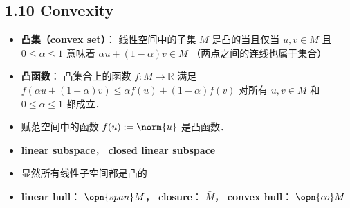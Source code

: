 \subsection{1.10 Convexity}
\begin{itemize}
\item \textbf{凸集（convex set）}： 线性空间中的子集 $M$ 是凸的当且仅当 $u, v\in M$ 且 $0\le\alpha\le1$ 意味着 $\alpha u+(1-\alpha)v\in M$ （两点之间的连线也属于集合）

\item \textbf{凸函数}： 凸集合上的函数 $f:M\to\mathbb R$ 满足 $f(\alpha u + (1-\alpha)v) \le \alpha f(u)+(1-\alpha)f(v)$ 对所有 $u, v\in M$ 和 $0\le\alpha\le1$ 都成立．

\item 赋范空间中的函数 $f(u) := \norm{u}$ 是凸函数．

\item \textbf{linear subspace}， \textbf{closed linear subspace}

\item 显然所有线性子空间都是凸的

\item \textbf{linear hull}： $\opn{span} M$， \textbf{closure}： $\bar M$， \textbf{convex hull}： $\opn{co} M$
\end{itemize}



